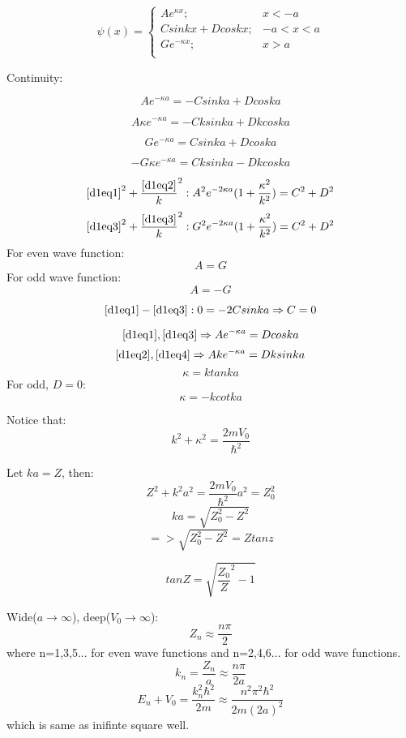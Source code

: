 \documentclass[12pt,a4paper]{article}
\begin{document}
\[
   \psi (x)=\begin{cases}
              Ae^{\kappa x} ; &  x<-a \\
              Csinkx+Dcoskx;      & -a<x<a \\
              Ge^{-\kappa x};      & x>a \\
         \end{cases}
\]

Continuity:

\begin{equation} \label{d1eq1}
Ae^{-\kappa a}=-Csinka+Dcoska
\end{equation}

\begin{equation} \label{d1eq2}
A \kappa e^{-\kappa a}=-Cksinka+Dkcoska
\end{equation}

\begin{equation} \label{d1eq3}
Ge^{-\kappa a}=Csinka+Dcoska
\end{equation}

\begin{equation} \label{d1eq4}
-G\kappa e^{-\kappa a}=Cksinka-Dkcoska
\end{equation}

\[
\ref{d1eq1}^2+\frac{\ref{d1eq2}}{k} ^2: A^2 e^{-2\kappa a} (1+\frac{\kappa ^2}{k^2})=C^2 + D^2
\]
\[
\ref{d1eq3}^2+\frac{\ref{d1eq3}}{k} ^2: G^2 e^{-2\kappa a} (1+\frac{\kappa ^2}{k^2})=C^2 + D^2
\]
For even wave function:
\[
A=G
\]
For odd wave function:
\[
A=-G
\]

\[
\ref{d1eq1}-\ref{d1eq3}:0=-2Csinka \Rightarrow  C=0
\]

\[
\ref{d1eq1},\ref{d1eq3} \Rightarrow Ae^{-\kappa a}=Dcoska
\]
\[
\ref{d1eq2},\ref{d1eq4} \Rightarrow Ake^{-\kappa a}=Dksinka
\]
\[
\kappa =ktanka
\]
For odd, $D=0$:
\[
\kappa=-kcotka
\]

Notice that:
\[
k^2 + \kappa ^2 = \frac{2mV_0}{\hbar ^2}
\]

Let $ka=Z$, then:
\[
Z^2 + k^2 a^2 = \frac{2mV_0}{\hbar ^2} a^2 =Z_0 ^2
\]
\[
ka = \sqrt{Z_0 ^{2} - Z^2}
\]
\[
=>\sqrt{Z_0 ^{2} - Z^2}=Ztanz
\]

\[
tanZ=\sqrt{\frac{Z_0}{Z}^2 -1}
\]

Wide($a \to \infty$), deep($V_0 \to \infty$):
\[
Z_n \approx \frac{n \pi}{2}
\]
where n=1,3,5... for even wave functions and n=2,4,6... for odd wave functions.
\[
k_n=\frac{Z_n}{a} \approx \frac{n \pi}{2a}
\]
\[
E_n + V_0 = \frac{k_n ^2 \hbar ^2}{2m} \approx \frac{n^2 \pi ^2 \hbar ^2}{2m(2a)^2}
\]
which is same as inifinte square well.
\end{document}
